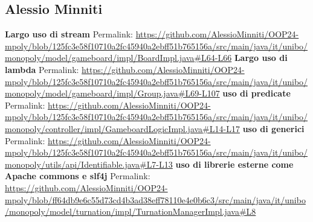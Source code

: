 \subsection{Alessio Minniti}
\textbf{Largo uso di stream}\newline
Permalink: \url{https://github.com/AlessioMinniti/OOP24-mpoly/blob/125fc3e58f10710a2fc45940a2ebff51b765156a/src/main/java/it/unibo/monopoly/model/gameboard/impl/BoardImpl.java#L64-L66}\newline\newline
\textbf{Largo uso di lambda}\newline
Permalink: \url{https://github.com/AlessioMinniti/OOP24-mpoly/blob/125fc3e58f10710a2fc45940a2ebff51b765156a/src/main/java/it/unibo/monopoly/model/gameboard/impl/Group.java#L69-L107}\newline\newline
\textbf{uso di predicate}\newline
Permalink: \url{https://github.com/AlessioMinniti/OOP24-mpoly/blob/125fc3e58f10710a2fc45940a2ebff51b765156a/src/main/java/it/unibo/monopoly/controller/impl/GameboardLogicImpl.java#L14-L17}\newline\newline
\textbf{uso di generici}\newline
Permalink: \url{https://github.com/AlessioMinniti/OOP24-mpoly/blob/125fc3e58f10710a2fc45940a2ebff51b765156a/src/main/java/it/unibo/monopoly/utils/api/Identifiable.java#L7-L13}\newline\newline
\textbf{uso di librerie esterne come Apache commons e slf4j}\newline
Permalink: \url{https://github.com/AlessioMinniti/OOP24-mpoly/blob/ff64db9e6c55d73cd4b3ad38eff78110e4e0b6c3/src/main/java/it/unibo/monopoly/model/turnation/impl/TurnationManagerImpl.java#L8}